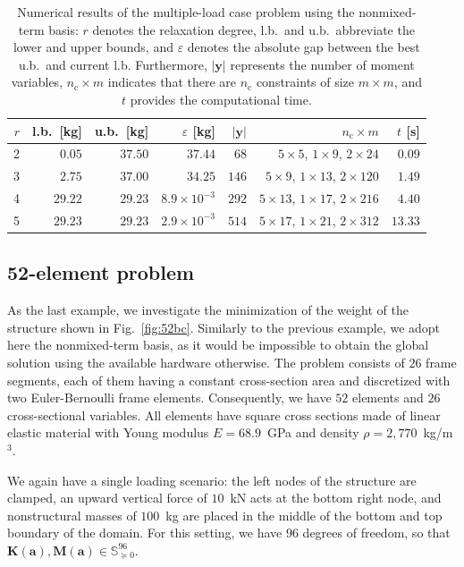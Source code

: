 \documentclass[final,onefignum,onetabnum]{siamart220329}
\begin{document}
{\begin{table}[!htbp]
    \centering
    \setlength{\tabcolsep}{5pt}
    \begin{tabular}{rrrrrrr}
         $r$ & l.b.\ [kg] & u.b.\ [kg] & $\varepsilon$ [kg] & $\lvert \mathbf{y}\rvert$ & $n_\mathrm{c} \times m$  & $t$ [s]\\ \hline
         2 & $0.05$ & $37.50$ & $37.44$ & $68$ & $5\times5$, $1\times9$, $2\times24$ & $0.09$\\
         3 & $2.75$ & $37.00$ & $34.25$ & $146$ & $5\times9$, $1\times13$, $2\times120$ & $1.49$\\
         4 & $29.22$ & $29.23$ & $8.9\times10^{-3}$ & $292$ & $5\times13$, $1\times17$, $2\times216$ & $4.40$\\
         5 & $29.23$ & $29.23$ & $2.9\times10^{-3}$ & $514$ & $5\times17$, $1\times21$, $2\times312$ & $13.33$
    \end{tabular}
    \caption{Numerical results of the multiple-load case problem using the nonmixed-term basis: $r$ denotes the relaxation degree, l.b.\ and u.b.\ abbreviate the lower and upper bounds, and $\varepsilon$ denotes the absolute gap between the best u.b.\ and current l.b. Furthermore, $\lvert\mathbf{y}\rvert$ represents the number of moment variables, $n_\mathrm{c}\times m$ indicates that there are $n_\mathrm{c}$ constraints of size $m\times m$, and $t$ provides the computational time.}
    \label{tab:multilc}
\end{table}
}

\subsection{52-element problem}\label{sec:ex52}

As the last example, we investigate the minimization of the weight of the structure shown in Fig.~\ref{fig:52bc}. {Similarly to the previous example}, we adopt here the nonmixed-term basis{, as it} would be {im}possible {to obtain the global solution} using the {available} hardware otherwise. The problem consists of $26$ frame segments, each of them having a constant cross-section area and discretized with two Euler-Bernoulli frame elements. Consequently, we have $52$ elements and $26$ cross-sectional variables. All elements have square cross sections made of linear elastic material with Young modulus $E=68.9$~GPa and density $\rho=2,770$~kg/m$^3$.

We again have a single loading scenario: the left nodes of the structure are clamped, an upward vertical force of $10$~kN acts at the bottom right node, and nonstructural masses of $100$~kg are placed in the middle of the bottom and top boundary of the domain. For this setting, we have $96$ degrees of freedom, so that $\mathbf{K}(\mathbf{a}), \mathbf{M}(\mathbf{a}) \in \mathbb{S}^{96}_{\succeq 0}$.
\end{document}
